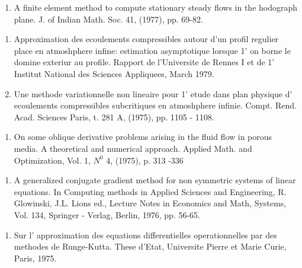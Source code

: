 \begin{thebibliography}{99}

  \begin{enumerate}
  \item A finite element method to compute stationary steady flows in
 the hodograph plane. J. of Indian Math. Soc. 41, (1977),
 pp. 69-82.\label{k35:e1} 
  \end{enumerate}


  \begin{enumerate}
  \item Approximation des ecoulements compressibles autour d'un profil
 regulier place en atmoshphere infine: estimation asymptotique
 lorsque 1' on borne le domine exteriur au profile. Rapport de
 l'Universite de Rennes I et de 1' Institut National des Sciences
 Appliquees, March 1979.\label{k36:e1} 

  \item  Une methode variationnelle non lineaire pour 1' etude dans
 plan physique d' ecoulements compressibles subcritiques en
 atmoshphere infinie. Compt. Rend. Acad. Sciences Paris, t. 281 A,
 (1975), pp. 1105 - 1108.\label{k36:e2} 
  \end{enumerate}


  \begin{enumerate}
  \item On some oblique derivative problems arising in the fluid flow
 in porous media. A theoretical and numerical approach. Applied
 Math. and Optimization, Vol. 1, $N^0$ 4, (1975), p. 313 -336\label{k37:e1} 
  \end{enumerate}

\pageoriginale

  \begin{enumerate}
  \item A generalized conjugate gradient method for non symmetric
 systems of linear equations. In Computing methods in Applied
 Sciences and Engineering, R. Glowinski, J.L. Lions ed., Lecture
 Notes in Economics and Math, Systems, Vol. 134, Springer - Verlag,
 Berlin, 1976, pp. 56-65.\label{k38:e1} 
  \end{enumerate}


  \begin{enumerate}
  \item Sur l' approximation des equations differentielles
 operationnelles par des methodes de Runge-Kutta. These d'Etat,
 Universite Pierre et Marie Curie, Paris, 1975.\label{k39:e1}
  \end{enumerate}


\end{thebibliography}
